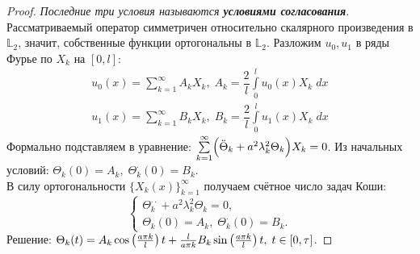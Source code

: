 \documentclass[../main.tex]{subfiles}
\begin{document}
\begin{proof}
\textit{Последние три условия называются \textbf{условиями согласования}}. \\
Рассматриваемый оператор симметричен относительно скалярного произведения в $\mathbb{L}_2$, значит, собственные функции ортогональны в $\mathbb{L}_2$. Разложим $u_0, u_1$ в ряды Фурье по $X_k$ на $[0, l]$:
\begin{align*}
	u_0(x) = \sum\limits_{k = 1}^{\infty} A_kX_k,\; A_k = \dfrac{2}{l} \int\limits_{0}^l u_0(x)X_k\;dx \\
	u_1(x) = \sum\limits_{k = 1}^{\infty} B_kX_k,\; B_k = \dfrac{2}{l} \int\limits_{0}^l u_1(x)X_k\;dx 
\end{align*}
Формально подставляем в уравнение: $\sum\limits_{k = 1}^{\infty} \Bigl( \ddot{\Theta}_k + a^2 \lambda_k^2\Theta_k \Bigr)X_k = 0$. Из начальных условий: $\Theta_k(0) = A_k,\; \Theta^{\cdotp}_k(0) = B_k$. \\
В силу ортогональности $\{X_k(x)\}_{k = 1}^{\infty}$ получаем счётное число задач Коши:
\begin{equation*}
\begin{cases}
	\Theta^{\cdotp \cdotp}_k + a^2 \lambda_k^2\Theta_k = 0, \\
	\Theta_k(0) = A_k,\; \Theta^{\cdotp}_k(0) = B_k.
\end{cases}
\end{equation*}
Решение: $\Theta_k(t) = A_k\cos \left(\frac{a \pi k}{l}\right)t + \frac{l}{a \pi k}B_k \sin \left(\frac{a \pi k}{l}\right)t,\; t \in [0, \tau]$. 
\end{proof}
\end{document}

